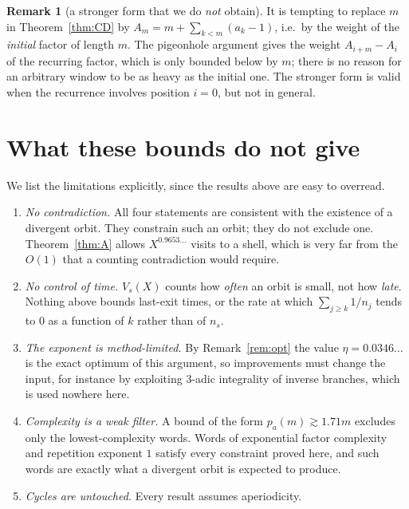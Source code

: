 \documentclass[11pt,reqno]{amsart}
\theoremstyle{plain}
\theoremstyle{definition}
\newtheorem{remark}[theorem]{Remark}
\numberwithin{equation}{section}
\begin{document}
\begin{remark}[a stronger form that we do \emph{not} obtain]
It is tempting to replace $m$ in Theorem~\ref{thm:CD} by $A_m=m+\sum_{k<m}(a_k-1)$,
i.e.\ by the weight of the \emph{initial} factor of length $m$.  The
pigeonhole argument gives the weight $A_{i+m}-A_i$ of the recurring factor,
which is only bounded below by $m$; there is no reason for an arbitrary
window to be as heavy as the initial one.  The stronger form is valid when
the recurrence involves position $i=0$, but not in general.
\end{remark}

\section{What these bounds do not give}
\label{sec:limits}

We list the limitations explicitly, since the results above are easy to
overread.

\begin{enumerate}
  \item \emph{No contradiction.}  All four statements are consistent with the
        existence of a divergent orbit.  They constrain such an orbit; they do
        not exclude one.  Theorem~\ref{thm:A} allows $X^{0.9653\ldots}$ visits
        to a shell, which is very far from the $O(1)$ that a
        counting contradiction would require.

  \item \emph{No control of time.}  $V_s(X)$ counts how \emph{often} an orbit
        is small, not how \emph{late}.  Nothing above bounds last-exit times,
        or the rate at which $\sum_{j\ge k}1/n_j$ tends to $0$ as a function
        of $k$ rather than of $n_s$.

  \item \emph{The exponent is method-limited.}  By Remark~\ref{rem:opt} the
        value $\eta=0.0346\ldots$ is the exact optimum of this argument, so
        improvements must change the input, for instance by exploiting
        $3$-adic integrality of inverse branches, which is used nowhere here.

  \item \emph{Complexity is a weak filter.}  A bound of the form
        $p_a(m)\gtrsim1.71m$ excludes only the lowest-complexity words.
        Words of exponential factor complexity and repetition exponent $1$
        satisfy every constraint proved here, and such words are exactly what
        a divergent orbit is expected to produce.

  \item \emph{Cycles are untouched.}  Every result assumes aperiodicity.
\end{enumerate}
\end{document}
